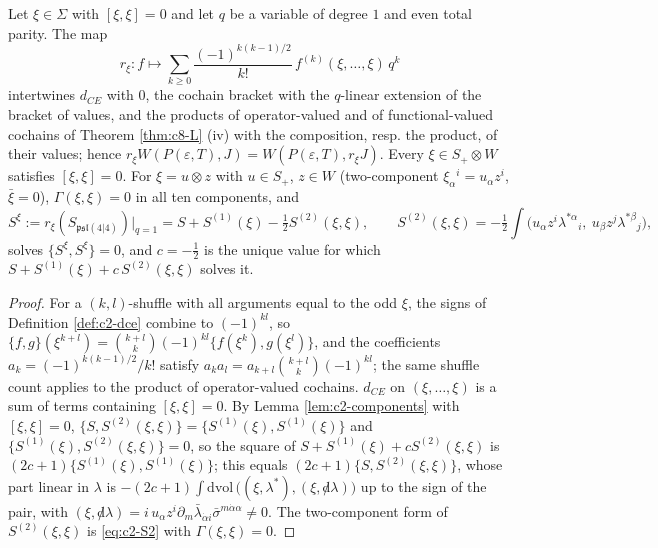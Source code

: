 \begin{lemma}
\label{lem:c8-ev}
Let $\xi\in\Sigma$ with $[\xi,\xi]=0$ and let $q$ be a variable of degree $1$ and even total parity. The map
\[
r_\xi\colon f\mapsto\sum_{k\ge0}\frac{(-1)^{k(k-1)/2}}{k!}\,f^{(k)}(\xi,\dots,\xi)\,q^k
\]
intertwines $d_{CE}$ with $0$, the cochain bracket with the $q$-linear extension of the bracket of values, and the products of operator-valued and of functional-valued cochains of Theorem \ref{thm:c8-L} (iv) with the composition, resp. the product, of their values; hence $r_\xi W(P(\varepsilon,T),J)=W(P(\varepsilon,T),r_\xi J)$. Every $\xi\in S_+\otimes W$ satisfies $[\xi,\xi]=0$. For $\xi=u\otimes z$ with $u\in S_+$, $z\in W$ (two-component $\xi_\alpha{}^i=u_\alpha z^i$, $\bar\xi=0$), $\Gamma(\xi,\xi)=0$ in all ten components, and
\begin{equation}
S^\xi:=r_\xi(S_{\mathfrak{psl}(4|4)})\big|_{q=1}=S+S^{(1)}(\xi)-\tfrac12S^{(2)}(\xi,\xi),\qquad S^{(2)}(\xi,\xi)=-\tfrac12\int\big(u_\alpha z^i\lambda^{*\alpha}{}_i,\ u_\beta z^j\lambda^{*\beta}{}_j\big),
\label{eq:c8-twistaction}
\end{equation}
solves $\{S^\xi,S^\xi\}=0$, and $c=-\tfrac12$ is the unique value for which $S+S^{(1)}(\xi)+c\,S^{(2)}(\xi,\xi)$ solves it.
\end{lemma}

\begin{proof}
For a $(k,l)$-shuffle with all arguments equal to the odd $\xi$, the signs of Definition \ref{def:c2-dce} combine to $(-1)^{kl}$, so $\{f,g\}(\xi^{k+l})=\binom{k+l}{k}(-1)^{kl}\{f(\xi^k),g(\xi^l)\}$, and the coefficients $a_k=(-1)^{k(k-1)/2}/k!$ satisfy $a_ka_l=a_{k+l}\binom{k+l}{k}(-1)^{kl}$; the same shuffle count applies to the product of operator-valued cochains. $d_{CE}$ on $(\xi,\dots,\xi)$ is a sum of terms containing $[\xi,\xi]=0$. By Lemma \ref{lem:c2-components} with $[\xi,\xi]=0$, $\{S,S^{(2)}(\xi,\xi)\}=\{S^{(1)}(\xi),S^{(1)}(\xi)\}$ and $\{S^{(1)}(\xi),S^{(2)}(\xi,\xi)\}=0$, so the square of $S+S^{(1)}(\xi)+cS^{(2)}(\xi,\xi)$ is $(2c+1)\{S^{(1)}(\xi),S^{(1)}(\xi)\}$; this equals $(2c+1)\{S,S^{(2)}(\xi,\xi)\}$, whose part linear in $\lambda$ is $-(2c+1)\int\mathrm{dvol}\,\big((\xi,\lambda^*),(\xi,{\not d}\lambda)\big)$ up to the sign of the pair, with $(\xi,{\not d}\lambda)=i\,u_\alpha z^i\partial_m\bar\lambda_{\dot\alpha i}\bar\sigma^{m\dot\alpha\alpha}\neq0$. The two-component form of $S^{(2)}(\xi,\xi)$ is \eqref{eq:c2-S2} with $\Gamma(\xi,\xi)=0$.
\end{proof}

